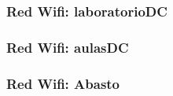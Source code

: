 \subsubsection{Red Wifi: laboratorioDC}


\newpage
\subsubsection{Red Wifi: aulasDC}


\newpage
\subsubsection{Red Wifi: Abasto}
